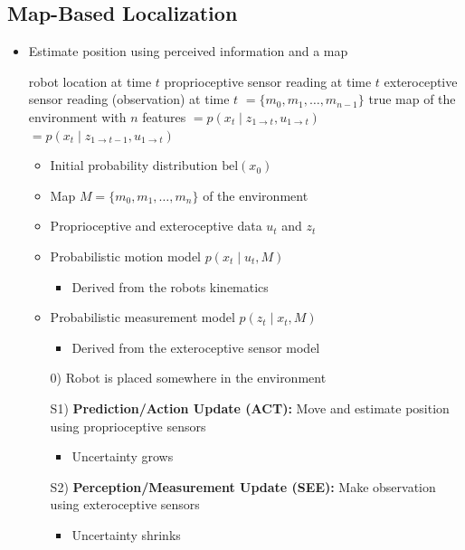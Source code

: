\subsection{Map-Based Localization}
\begin{itemize}
    \item Estimate position using perceived information and a map
        \begin{itemize*}
             robot location at time $t$
             proprioceptive sensor reading at time $t$
             exteroceptive sensor reading (observation) at time $t$
            $= \{m_0, m_1, \dots, m_{n-1}\}$ true map of the environment with $n$ features
            $= p(x_t \mid z_{1 \to t}, u_{1 \to t})$
            $= p(x_t \mid z_{1 \to t - 1}, u_{1 \to t})$
        \end{itemize*}
        \begin{itemize}
            \item Initial probability distribution $\text{bel}(x_0)$
            \item Map $M = \{m_0, m_1, \dots, m_n\}$ of the environment
            \item Proprioceptive and exteroceptive data $u_t$ and $z_t$
            \item Probabilistic motion model $p(x_t \mid u_t, M)$
                \begin{itemize}
                    \item Derived from the robots kinematics
                \end{itemize}
            \item Probabilistic measurement model $p(z_t \mid x_t, M)$
                \begin{itemize}
                    \item Derived from the exteroceptive sensor model
                \end{itemize}
        \end{itemize}
        \begin{itemize}
            \item[0)] Robot is placed somewhere in the environment
            \item[S1)] \textbf{Prediction/Action Update (ACT):} Move and estimate position using proprioceptive sensors
                \begin{itemize}
                    \item Uncertainty grows
                \end{itemize}
            \item[S2)] \textbf{Perception/Measurement Update (SEE):} Make observation using exteroceptive sensors
                \begin{itemize}
                    \item Uncertainty shrinks
                \end{itemize}
        \end{itemize}
\end{itemize}
